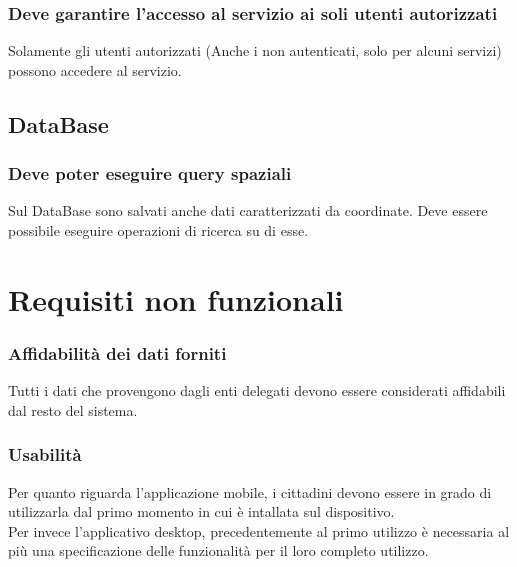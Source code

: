 \documentclass{article}
\begin{document}
\subsubsection{Deve garantire l'accesso al servizio ai soli utenti autorizzati}

Solamente gli utenti autorizzati (Anche i non autenticati, solo per alcuni servizi) possono accedere al servizio.

\subsection{DataBase}

\subsubsection{Deve poter eseguire query spaziali}
Sul DataBase sono salvati anche dati caratterizzati da coordinate. Deve essere possibile eseguire operazioni di ricerca su di esse.





\clearpage

\section{Requisiti non funzionali}

\subsubsection{Affidabilità dei dati forniti}
Tutti i dati che provengono dagli enti delegati devono essere considerati affidabili dal resto del sistema.

\subsubsection{Usabilità}
Per quanto riguarda l'applicazione mobile, i cittadini devono essere in grado di utilizzarla dal primo momento in cui è intallata sul dispositivo.\\
Per invece l'applicativo desktop, precedentemente al primo utilizzo è necessaria al più una specificazione delle funzionalità per il loro completo utilizzo.
\end{document}
